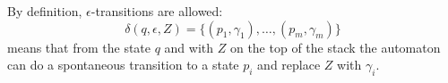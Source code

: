 

\setcounter{section}{6}
\setcounter{subsection}{1}
\setcounter{dfn}{2}


By definition, $\epsilon$-transitions are allowed:
\[
\delta(q, \epsilon, Z) = \{(p_1, \gamma_1), \ldots, (p_m, \gamma_m)\}
\]
means that from the state $q$ and with $Z$ on the top of the stack the automaton can do a spontaneous transition
to a state $p_i$ and replace $Z$ with $\gamma_i$.



